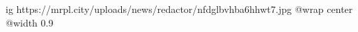  
 
 
 
 

\ifcmt
  ig https://mrpl.city/uploads/news/redactor/nfdglbvhba6hhwt7.jpg
  @wrap center
  @width 0.9
\fi
